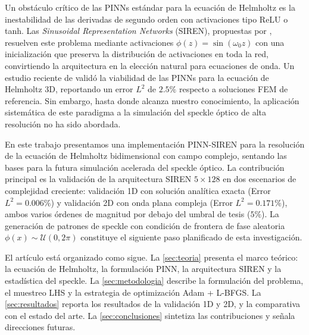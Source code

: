 Un obstáculo crítico de las PINNs estándar para la ecuación de Helmholtz es la inestabilidad
de las derivadas de segundo orden con activaciones tipo ReLU o tanh.
Las \textit{Sinusoidal Representation Networks} (SIREN), propuestas por
\citet{Sitzmann2020_SIREN}, resuelven este problema mediante activaciones
$\phi(z) = \sin(\omega_0 z)$ con una inicialización que preserva la distribución de
activaciones en toda la red, convirtiendo la arquitectura en la elección natural para
ecuaciones de onda.
Un estudio reciente de \citet{Schoder2024_PINN_acoustics} validó la viabilidad de las PINNs
para la ecuación de Helmholtz 3D, reportando un error $L^2$ de $2.5\%$ respecto a soluciones
FEM de referencia.
Sin embargo, hasta donde alcanza nuestro conocimiento, la aplicación sistemática de este
paradigma a la simulación del speckle óptico de alta resolución no ha sido abordada.

En este trabajo presentamos una implementación PINN-SIREN para la resolución de la ecuación
de Helmholtz bidimensional con campo complejo, sentando las bases para la futura simulación
acelerada del speckle óptico.
La contribución principal es la validación de la arquitectura SIREN $5\times128$ en dos
escenarios de complejidad creciente: validación 1D con solución analítica exacta
(Error $L^2 = 0.006\%$) y validación 2D con onda plana compleja (Error $L^2 = 0.171\%$),
ambos varios órdenes de magnitud por debajo del umbral de tesis ($5\%$).
La generación de patrones de speckle con condición de frontera de fase aleatoria
$\phi(x) \sim \mathcal{U}(0, 2\pi)$ constituye el siguiente paso planificado de esta investigación.

El artículo está organizado como sigue.
La \cref{sec:teoria} presenta el marco teórico: la ecuación de Helmholtz, la formulación PINN,
la arquitectura SIREN y la estadística del speckle.
La \cref{sec:metodologia} describe la formulación del problema, el muestreo LHS y la
estrategia de optimización Adam + L-BFGS.
La \cref{sec:resultados} reporta los resultados de la validación 1D y 2D, y la comparativa
con el estado del arte.
La \cref{sec:conclusiones} sintetiza las contribuciones y señala direcciones futuras.
